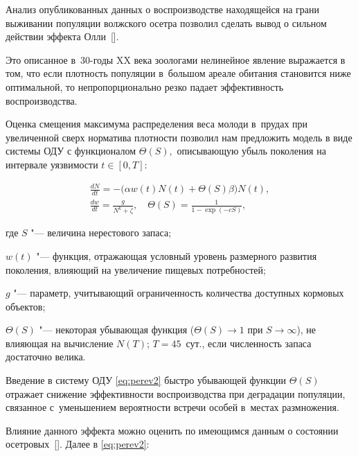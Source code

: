 Анализ опубликованных данных о воспроизводстве находящейся на грани выживании популяции волжского осетра позволил сделать вывод о сильном действии эффекта Олли~[]. 

Это описанное в~30-годы XX века зоологами нелинейное явление выражается в том, что если плотность популяции в~большом ареале обитания становится ниже оптимальной, то непропорционально резко падает эффективность воспроизводства. 

Оценка смещения максимума распределения веса молоди в~прудах при увеличенной сверх норматива плотности позволил нам предложить модель в виде системы ОДУ с функционалом $\Theta(S),$ описывающую убыль поколения на интервале уязвимости $t\in[0, T]$:

\begin{equation}

\label{eq:perev2}

\begin{array}{l}

\displaystyle

\frac{dN}{dt}  = -\bigl(\alpha w(t)N(t) +\Theta(S)\beta \bigr)N(t) , \\[2mm]

\displaystyle \frac{dw}{dt} = \frac{g}{N^k + \zeta}, \quad  \Theta(S) =\frac{1}{1-\exp(-cS)}

,

\end{array}

\end{equation}

где $S$ "--- величина нерестового запаса; 

$w(t)$ "--- функция, отражающая условный уровень размерного развития поколения, влияющий на увеличение пищевых потребностей; 

$g$ "--- параметр, учитывающий ограниченность количества доступных кормовых объектов; 

$\Theta(S)$ "--- некоторая убывающая функция ($\Theta(S)\to 1 \text{ при } S\to \infty$), не влияющая на вычисление $N(T)$; $T=45$~сут., если численность запаса достаточно велика. 



Введение в систему ОДУ \eqref{eq:perev2} быстро убывающей функции $\Theta(S)$ отражает снижение эффективности воспроизводства при деградации популяции, связанное с~уменьшением вероятности встречи особей в~местах размножения. 

Влияние данного эффекта можно оценить по имеющимся данным о состоянии осетровых~[]. Далее в \eqref{eq:perev2}: 


